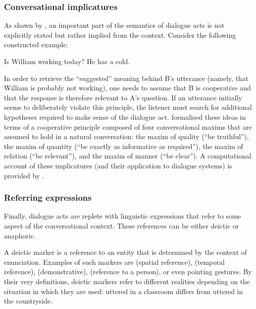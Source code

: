 \subsubsection*{Conversational implicatures}
As shown by \cite{Grice1989}, an important part of the semantics of dialogue acts is not explicitly stated but rather implied from the context.  Consider the following constructed example: 
\begin{center}
\begin{dialogue}
 Is William working today?
 He has a cold.
\end{dialogue}
\end{center}
In order to retrieve the ``suggested'' meaning behind B's utterance (namely, that William is probably not working), one needs to assume that B is cooperative and that the response is therefore relevant to A's question.  If an utterance initially seems to deliberately violate this principle, the listener must search for additional hypotheses required to make sense of the dialogue act. \cite{Grice1989} formalised these ideas in terms of a cooperative principle composed of four conversational maxims that are assumed to hold in a natural conversation: the maxim of quality (``be truthful''), the maxim of quantity (``be exactly as informative as required''), the maxim of relation (``be relevant''), and the maxim of manner (``be clear'').  A computational account of these implicatures (and their application to dialogue systems) is provided by \cite{benotti2010implicature}. 


\subsubsection*{Referring expressions}

Finally, dialogue acts are replete with linguistic expressions that refer to some aspect of the conversational context.  These references can be either deictic or anaphoric. 

A deictic marker is a reference to an entity that is determined by the context of enunciation.  Examples of such markers are  (spatial reference),  (temporal reference),  (demonstrative),  (reference to a person), or even pointing gestures. By their very definitions, deictic markers refer to different realities depending on the situation in which they are used:  uttered in a classroom differs from  uttered in the countryside.  

